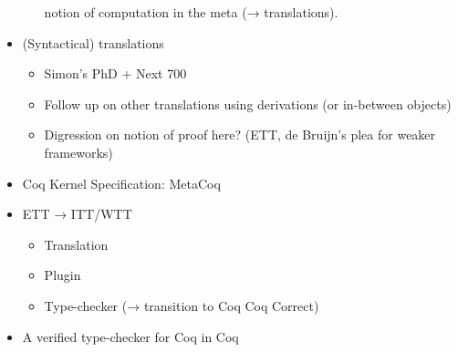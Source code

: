 \begin{itemize}
\begin{itemize}
      notion of computation in the meta (→ translations).
    \end{itemize}
  \item (Syntactical) translations
    \begin{itemize}
      \item Simon's PhD + Next 700
      \item Follow up on other translations using derivations (or in-between
      objects)
      \item Digression on notion of proof here? (ETT, de Bruijn's plea for
      weaker frameworks)
    \end{itemize}
  \item Coq Kernel Specification: MetaCoq
  \item ETT → ITT/WTT
    \begin{itemize}
      \item Translation
      \item Plugin
      \item Type-checker (→ transition to Coq Coq Correct)
    \end{itemize}
  \item A verified type-checker for Coq in Coq
\end{itemize}